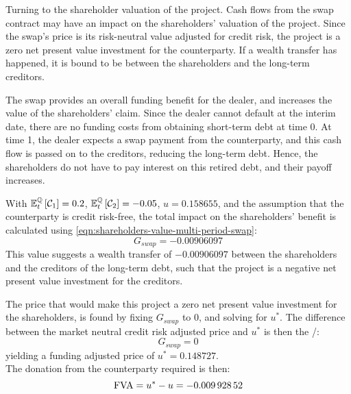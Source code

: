 \documentclass[main.tex]{subfiles}
\begin{document}
            Turning to the shareholder valuation of the project.
            Cash flows from the swap contract may have an impact on the shareholders' valuation of the project.
            Since the swap's price is its risk-neutral value adjusted for credit risk,
            the project is a zero net present value investment for the counterparty.
            If a wealth transfer has happened, it is bound to be between the shareholders and the long-term creditors.

            The swap provides an overall funding benefit for the dealer,
            and increases the value of the shareholders' claim.
            Since the dealer cannot default at the interim date,
            there are no funding costs from obtaining short-term debt at time 0.
            At time 1, the dealer expects a swap payment from the counterparty,
            and this cash flow is passed on to the creditors, reducing the long-term debt.
            Hence, the shareholders do not have to pay interest on this retired debt,
            and their payoff increases.
            
            With $\mathbb{E}_{t}^{\mathbb{Q}}\left[\mathcal{C}_1\right]=\num{0.2}$,
            $\mathbb{E}_{t}^{\mathbb{Q}}\left[\mathcal{C}_2\right]=\num{-0.05}$,
            $u=\num{0.158655}$,
            and the assumption that the counterparty is credit risk-free,
            the total impact on the shareholders' benefit is calculated using \cref{eqn:shareholders-value-multi-period-swap}:
            \begin{equation}
                G_{swap} = \num{-0.00906097}
            \end{equation}
            This value suggests a wealth transfer of $\num{-0.00906097}$
            between the shareholders and the creditors of the long-term debt,
            such that the project is a negative net present value investment for the creditors.

            The price that would make this project a zero net present value investment for the shareholders,
            is found by fixing $G_{swap}$ to 0,
            and solving for $u^{\ast}$.
            The difference between the market neutral credit risk adjusted price and $u^{\ast}$ is then the \FVA/:
            \begin{equation}
                G_{swap} = 0
            \end{equation}
            yielding a funding adjusted price of $u^{\ast} = \num{0.148727}$.
            \\
            The donation from the counterparty required is then:
            \begin{equation}
                \FVA/ = u^{\ast} - u = \num{-0.00992852}
            \end{equation}
\end{document}

